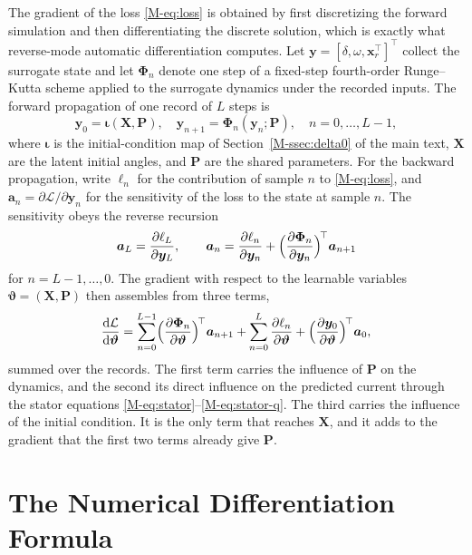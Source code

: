 \documentclass[10pt,journal]{IEEEtran}
\begin{document}
The gradient of the loss \eqref{M-eq:loss} is obtained by first discretizing the forward simulation and then differentiating the discrete solution, which is exactly what reverse-mode automatic differentiation computes.
Let $\bm{y}=[\delta,\omega,\bm{x}_r^\top]^\top$ collect the surrogate state and let $\bm{\Phi}_n$ denote one step of a fixed-step fourth-order Runge--Kutta scheme applied to the surrogate dynamics under the recorded inputs.
The forward propagation of one record of $L$ steps is
\begin{equation}\label{eq:forward}
\bm{y}_0=\bm{\iota}(\bm{X},\bm{P}),\quad
\bm{y}_{n+1}=\bm{\Phi}_n(\bm{y}_n;\bm{P}),\quad n=0,\dots,L-1,
\end{equation}
where $\bm{\iota}$ is the initial-condition map of Section~\ref{M-ssec:delta0} of the main text, $\bm{X}$ are the latent initial angles, and $\bm{P}$ are the shared parameters.
For the backward propagation, write $\ell_n$ for the contribution of sample $n$ to \eqref{M-eq:loss}, and $\bm{a}_n=\partial\mathcal{L}/\partial\bm{y}_n$ for the sensitivity of the loss to the state at sample $n$.
The sensitivity obeys the reverse recursion
\begin{equation}\label{eq:adjoint}
\bm{a}_L=\frac{\partial\ell_L}{\partial\bm{y}_L},\qquad
\bm{a}_n=\frac{\partial\ell_n}{\partial\bm{y}_n}
+\Bigl(\frac{\partial\bm{\Phi}_n}{\partial\bm{y}_n}\Bigr)^{\!\top}\bm{a}_{n+1}
\end{equation}
for $n=L-1,\dots,0$.
The gradient with respect to the learnable variables $\bm{\vartheta}=(\bm{X},\bm{P})$ then assembles from three terms,
\begin{equation}\label{eq:grad}
\frac{\mathrm{d}\mathcal{L}}{\mathrm{d}\bm{\vartheta}}
=\sum_{n=0}^{L-1}\Bigl(\frac{\partial\bm{\Phi}_n}{\partial\bm{\vartheta}}\Bigr)^{\!\top}\bm{a}_{n+1}
+\sum_{n=0}^{L}\frac{\partial\ell_n}{\partial\bm{\vartheta}}
+\Bigl(\frac{\partial\bm{y}_0}{\partial\bm{\vartheta}}\Bigr)^{\!\top}\bm{a}_0,
\end{equation}
summed over the records.
The first term carries the influence of $\bm{P}$ on the dynamics, and the second its direct influence on the predicted current through the stator equations \eqref{M-eq:stator}--\eqref{M-eq:stator-q}.
The third carries the influence of the initial condition.
It is the only term that reaches $\bm{X}$, and it adds to the gradient that the first two terms already give $\bm{P}$.

\section{The Numerical Differentiation Formula}\label{sec:ndf}
\end{document}

